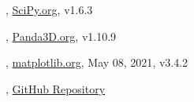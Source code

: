 \documentclass[12pt]{article}
\begin{document}
\begin{thebibliography}{99}
	, {\href{https://scipy.org/doc}{ SciPy.org}},{ v1.6.3}
	
	, {\href{https://docs.panda3d.org/1.10/python/index}{ Panda3D.org}},{ v1.10.9}
	
	, {\href{https://matplotlib.org/stable/contents.html}{ matplotlib.org}}, {May 08, 2021}, { v3.4.2}
	
	, {\href{https://github.com/Wanderson-Magalhaes} {GitHub Repository}}
	
\end{thebibliography}
\end{document}
